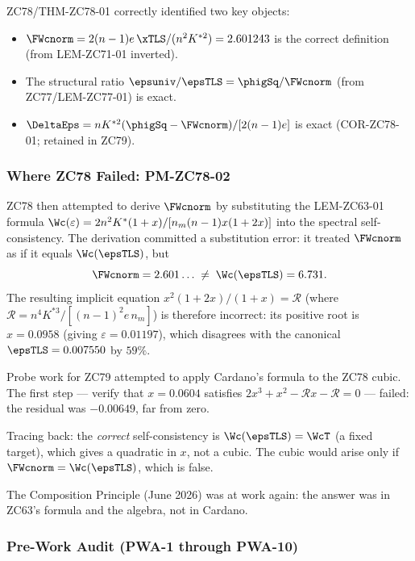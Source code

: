 \documentclass[12pt, a4paper]{article}
\begin{document}
ZC78/THM-ZC78-01 correctly identified two key objects:
\begin{itemize}[leftmargin=2em, noitemsep]
  \item $\FWcnorm = 2(n-1)e\,\xTLS/(n^2K^{*2}) = 2.601243$ is the
    correct definition (from LEM-ZC71-01 inverted).
  \item The structural ratio $\epsuniv/\epsTLS = \phigSq/\FWcnorm$
    (from ZC77/LEM-ZC77-01) is exact.
  \item $\DeltaEps = nK^{*2}(\phigSq - \FWcnorm)/[2(n-1)e]$
    is exact (COR-ZC78-01; retained in ZC79).
\end{itemize}

\subsubsection{Where ZC78 Failed: PM-ZC78-02}

ZC78 then attempted to derive $\FWcnorm$ by substituting
the LEM-ZC63-01 formula $\Wc(\varepsilon) = 2n^2K^*(1+x)/[n_m(n-1)x(1+2x)]$
into the spectral self-consistency.
The derivation committed a substitution error:
it treated $\FWcnorm$ as if it equals $\Wc(\epsTLS)$, but
\[
  \FWcnorm = 2.601\ldots \;\neq\; \Wc(\epsTLS) = 6.731.
\]
The resulting implicit equation $x^2(1+2x)/(1+x) = \mathcal{R}$
(where $\mathcal{R} = n^4K^{*3}/[(n-1)^2e\,n_m]$) is therefore
incorrect: its positive root is $x = 0.0958$
(giving $\varepsilon = 0.01197$), which disagrees with the
canonical $\epsTLS = 0.007550$ by $59\%$.

\begin{derivedbox}[title={Discovery Note --- The Gift From ZC79's Probe}]
Probe work for ZC79 attempted to apply Cardano's formula to the
ZC78 cubic. The first step --- verify that $x=0.0604$ satisfies
$2x^3+x^2-\mathcal{R}x-\mathcal{R}=0$ --- failed:
the residual was $-0.00649$, far from zero.

Tracing back: the \emph{correct} self-consistency is
$\Wc(\epsTLS) = \WcT$ (a fixed target), which gives a
quadratic in $x$, not a cubic.
The cubic would arise only if $\FWcnorm = \Wc(\epsTLS)$,
which is false.

The Composition Principle (June 2026)
was at work again: the answer was in ZC63's formula
and the algebra, not in Cardano.
\end{derivedbox}

\subsubsection{Pre-Work Audit (PWA-1 through PWA-10)}
\end{document}
